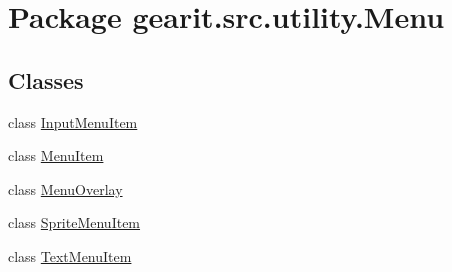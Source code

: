 \hypertarget{namespacegearit_1_1src_1_1utility_1_1_menu}{\section{Package gearit.\+src.\+utility.\+Menu}
\label{namespacegearit_1_1src_1_1utility_1_1_menu}
}
\subsection*{Classes}
\begin{DoxyCompactItemize}
\item 
class \hyperlink{classgearit_1_1src_1_1utility_1_1_menu_1_1_input_menu_item}{Input\+Menu\+Item}
\item 
class \hyperlink{classgearit_1_1src_1_1utility_1_1_menu_1_1_menu_item}{Menu\+Item}
\item 
class \hyperlink{classgearit_1_1src_1_1utility_1_1_menu_1_1_menu_overlay}{Menu\+Overlay}
\item 
class \hyperlink{classgearit_1_1src_1_1utility_1_1_menu_1_1_sprite_menu_item}{Sprite\+Menu\+Item}
\item 
class \hyperlink{classgearit_1_1src_1_1utility_1_1_menu_1_1_text_menu_item}{Text\+Menu\+Item}
\end{DoxyCompactItemize}
